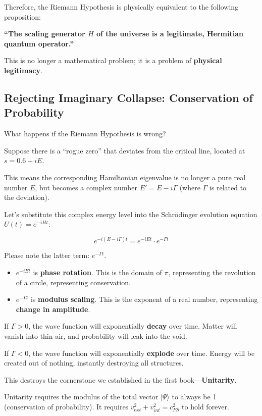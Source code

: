 \documentclass[11pt,a4paper,twoside]{book}
\begin{document}
Therefore, the Riemann Hypothesis is physically equivalent to the following proposition:

\textbf{``The scaling generator $H$ of the universe is a legitimate, Hermitian quantum operator.''}

This is no longer a mathematical problem; it is a problem of \textbf{physical legitimacy}.

\subsection{Rejecting Imaginary Collapse: Conservation of Probability}

What happens if the Riemann Hypothesis is wrong?

Suppose there is a ``rogue zero'' that deviates from the critical line, located at $s = 0.6 + iE$.

This means the corresponding Hamiltonian eigenvalue is no longer a pure real number $E$, but becomes a complex number $E' = E - i\Gamma$ (where $\Gamma$ is related to the deviation).

Let's substitute this complex energy level into the Schrödinger evolution equation $U(t) = e^{-iHt}$:

$$e^{-i(E - i\Gamma)t} = e^{-iEt} \cdot e^{-\Gamma t}$$

Please note the latter term: \textbf{$e^{-\Gamma t}$}.

\begin{itemize}
\item \textbf{$e^{-iEt}$} is \textbf{phase rotation}. This is the domain of $\pi$, representing the revolution of a circle, representing conservation.

\item \textbf{$e^{-\Gamma t}$} is \textbf{modulus scaling}. This is the exponent of a real number, representing \textbf{change in amplitude}.
\end{itemize}

If $\Gamma > 0$, the wave function will exponentially \textbf{decay} over time. Matter will vanish into thin air, and probability will leak into the void.

If $\Gamma < 0$, the wave function will exponentially \textbf{explode} over time. Energy will be created out of nothing, instantly destroying all structures.

This destroys the cornerstone we established in the first book—\textbf{Unitarity}.

Unitarity requires the modulus of the total vector $|\Psi\rangle$ to always be 1 (conservation of probability). It requires $v_{ext}^2 + v_{int}^2 = c_{FS}^2$ to hold forever.
\end{document}

